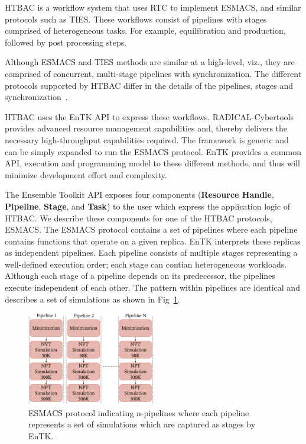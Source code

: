 
HTBAC is a workflow system that uses RTC to implement ESMACS, and similar
protocols such as TIES\@. These workflows consist of pipelines with stages
comprised of heterogeneous tasks. For example, equilibration and production,
followed by post processing steps.

Although ESMACS and TIES methods are similar at a high-level, viz., they are
comprised of concurrent, multi-stage pipelines with synchronization. The
different protocols supported by HTBAC differ in the details of the
pipelines, stages and synchronization~\cite{Bhati2017}.

HTBAC uses the EnTK API to express these workflows. RADICAL-Cybertools
provides advanced resource management capabilities and, thereby delivers the
necessary high-throughput capabilities required. The framework is generic and
can be simply expanded to run the ESMACS protocol. EnTK provides a common
API, execution and programming model to these different methods, and thus
will minimize development effort and complexity.

The Ensemble Toolkit API exposes four components (\textbf{Resource Handle},
\textbf{Pipeline}, \textbf{Stage}, and \textbf{Task}) to the user which
express the application logic of HTBAC\@. We describe these components for
one of the HTBAC protocols, ESMACS\@. The ESMACS protocol contains a set of
pipelines where each pipeline contains functions that operate on a given
replica. EnTK interprets these replicas as independent pipelines. Each
pipeline consists of multiple stages representing a well-defined execution
order; each stage can contian heterogeneous workloads. Although each stage of
a pipeline depends on its predecessor, the pipelines execute independent of
each other. The pattern within pipelines are identical and describes a set of
simulations as shown in Fig~\ref{figure:ESMACS-pipelines}.

\begin{figure}
\centering
  \includegraphics[width=0.5\textwidth]{FIGURES/HT-BAC_NAMD_pipelines_control_flow_only.pdf}
  \caption{ESMACS protocol indicating n-pipelines where each pipeline
  represents a set of simulations which are captured as stages by
  EnTK.}\label{figure:ESMACS-pipelines}
\end{figure}

